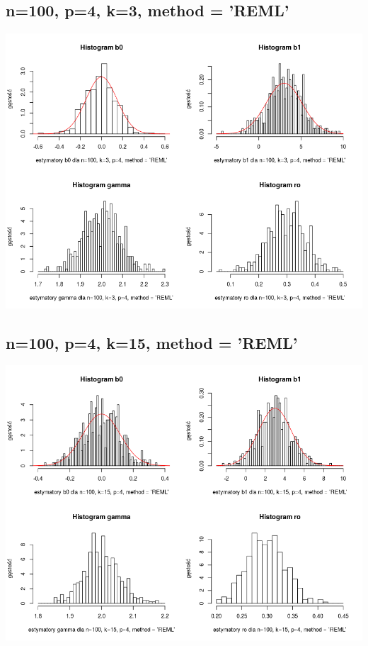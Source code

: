 \documentclass[a4paper,11pt]{article}
\begin{document}
\subsection{n=100, p=4,  k=3,  method = 'REML'}
\includegraphics[scale=.8]{Rplot3.png} 

\subsection{n=100, p=4,  k=15,  method = 'REML'}
\includegraphics[scale=.8]{Rplot4.png} 
\end{document}
